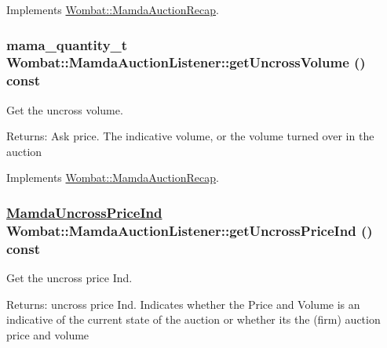 Implements \hyperlink{classWombat_1_1MamdaAuctionRecap_6a54a4b7e3c25078a631192d8af96b1f}{Wombat::Mamda\-Auction\-Recap}.\hypertarget{classWombat_1_1MamdaAuctionListener_f6f979ad6d52cb722c975cbc0e5fd177}{
\subsubsection[getUncrossVolume]{\setlength{\rightskip}{0pt plus 5cm}mama\_\-quantity\_\-t Wombat::Mamda\-Auction\-Listener::get\-Uncross\-Volume () const}}
\label{classWombat_1_1MamdaAuctionListener_f6f979ad6d52cb722c975cbc0e5fd177}


Get the uncross volume. 

\begin{Desc}
\item[Returns:]Ask price. The indicative volume, or the volume turned over in the auction \end{Desc}


Implements \hyperlink{classWombat_1_1MamdaAuctionRecap_d6d2a20927c91f960d10d2820c154998}{Wombat::Mamda\-Auction\-Recap}.\hypertarget{classWombat_1_1MamdaAuctionListener_e42ba9609a3c40772a5cc3b89d5c5a93}{
\subsubsection[getUncrossPriceInd]{\setlength{\rightskip}{0pt plus 5cm}\hyperlink{namespaceWombat_4f0ec767cbe150ee160f65e719e76226}{Mamda\-Uncross\-Price\-Ind} Wombat::Mamda\-Auction\-Listener::get\-Uncross\-Price\-Ind () const}}
\label{classWombat_1_1MamdaAuctionListener_e42ba9609a3c40772a5cc3b89d5c5a93}


Get the uncross price Ind. 

\begin{Desc}
\item[Returns:]uncross price Ind. Indicates whether the Price and Volume is an indicative of the current state of the auction or whether its the (firm) auction price and volume \end{Desc}


